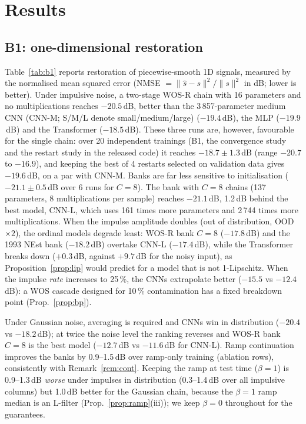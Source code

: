 \documentclass[11pt,a4paper]{article}
\theoremstyle{definition}
\theoremstyle{remark}
\begin{document}
\section{Results}\label{sec:results}

\subsection{B1: one-dimensional restoration}
Table~\ref{tab:b1} reports restoration of piecewise-smooth 1D signals, measured by the normalised mean squared error
(NMSE $=\|\hat s-s\|^2/\|s\|^2$ in dB; lower is better). Under impulsive noise, a two-stage WOS-R chain with
16 parameters and no multiplications reaches $-20.5$\,dB, better than the 3\,857-parameter medium CNN (CNN-M; S/M/L denote
small/medium/large) ($-19.4$\,dB), the MLP
($-19.9$\,dB) and the Transformer ($-18.5$\,dB). These three runs are, however, favourable for the single chain: over 20 independent trainings (B1, the convergence study and the restart study in the released code) it reaches $-18.7\pm1.3$\,dB (range $-20.7$ to $-16.9$), and keeping the best of 4 restarts selected on validation data gives $-19.6$\,dB, on a par with CNN-M. Banks are far less sensitive to initialisation ($-21.1\pm0.5$\,dB over 6 runs for $C{=}8$). The bank with $C{=}8$ chains (137 parameters, 8 multiplications per
sample) reaches $-21.1$\,dB, 1.2\,dB behind the best model, CNN-L, which uses 161 times more parameters and 2\,744 times
more multiplications. When the impulse amplitude doubles (out of distribution, OOD $\times2$), the ordinal models degrade least: WOS-R bank
$C{=}8$ ($-17.8$\,dB) and the 1993 NEst bank ($-18.2$\,dB) overtake CNN-L ($-17.4$\,dB), while the Transformer breaks
down ($+0.3$\,dB, against $+9.7$\,dB for the noisy input), as Proposition~\ref{prop:lip} would predict for a model that is
not 1-Lipschitz. When the impulse \emph{rate} increases to 25\,\%, the CNNs extrapolate better ($-15.5$ vs $-12.4$\,dB):
a WOS cascade designed for 10\,\% contamination has a fixed breakdown point (Prop.~\ref{prop:bp}).

Under Gaussian noise, averaging is required and CNNs win in distribution ($-20.4$ vs $-18.2$\,dB); at twice the noise
level the ranking reverses and WOS-R bank $C{=}8$ is the best model ($-12.7$\,dB vs $-11.6$\,dB for CNN-L). Ramp
continuation improves the banks by 0.9--1.5\,dB over ramp-only training (ablation rows), consistently with
Remark~\ref{rem:cont}. Keeping the ramp at test time ($\beta=1$) is 0.9--1.3\,dB \emph{worse} under impulses in
distribution (0.3--1.4\,dB over all impulsive columns) but 1.0\,dB better for the Gaussian chain, because the $\beta=1$ ramp median is an L-filter (Prop.~\ref{prop:ramp}(iii)); we keep
$\beta=0$ throughout for the guarantees.
\end{document}
